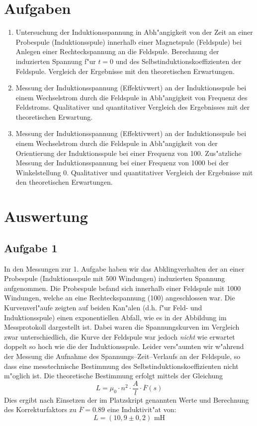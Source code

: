 \documentclass[a4paper,10pt]{article}
\begin{document}
\section{Aufgaben}
\begin{enumerate}
\item Untersuchung der Induktionsspannung in Abh"angigkeit von der Zeit an einer Probespule (Induktionsspule) innerhalb einer Magnetspule (Feldspule) bei Anlegen einer Rechteckspannung an die Feldspule. Berechnung der induzierten Spannung f"ur $t=0$ und des Selbstinduktionskoeffizienten der Feldspule. Vergleich der Ergebnisse mit den theoretischen Erwartungen.
\item Messung der Induktionsspannung (Effektivwert) an der Induktionsspule bei einem Wechselstrom durch die Feldspule in Abh"angigkeit von Frequenz des Feldstroms. Qualitativer und quantitativer Vergleich des Ergebnisses mit der theoretischen Erwartung.
\item Messung der Induktionsspannung (Effektivwert) an der Induktionsspule bei einem Wechselstrom durch die Feldspule in Abh"angigkeit von der Orientierung der Induktionsspule bei einer Frequenz von \unit{100}{\hertz}. Zus"atzliche Messung der Induktionsspannung bei einer Frequenz von \unit{1000}{\hertz} bei der Winkelstellung 0\degree. Qualitativer und quantitativer Vergleich der Ergebnisse mit den theoretischen Erwartungen. 
\end{enumerate}

\pagebreak
\newpage
\section{Auswertung}

\subsection{Aufgabe 1}
In den Messungen zur 1. Aufgabe haben wir das Abklingverhalten der an einer Probespule (Induktionsspule mit 500 Windungen) induzierten Spannung aufgenommen. Die Probespule befand sich innerhalb einer Feldspule mit 1000 Windungen, welche an eine Rechteckspannung (\unit{100}{\hertz}) angeschlossen war. Die Kurvenverl"aufe zeigten auf beiden Kan"alen (d.h. f"ur Feld- und Induktionsspule) einen exponentiellen Abfall, wie es in der Abbildung im Messprotokoll dargestellt ist. Dabei waren die Spannungskurven im Vergleich zwar unterschiedlich, die Kurve der Feldspule war jedoch \emph{nicht} wie erwartet doppelt so hoch wie die der Induktionsspule. Leider vers"aumten wir w"ahrend der Messung die Aufnahme des Spannungs--Zeit--Verlaufs an der Feldspule, so dass eine messtechnische Bestimmung des Selbstinduktionskoeffizienten nicht m"oglich ist. Die theoretische Bestimmung erfolgt mittels der Gleichung
\begin{equation}
L = \mu_0 \cdot n^2 \cdot \frac{A}{l} \cdot \overline{F}(s)
\end{equation}
Dies ergibt nach Einsetzen der im Platzskript genannten Werte und Berechnung des Korrekturfaktors zu $\overline{F}=0.89$ eine Induktivit"at von:
\begin{equation}
L = (10,9 \pm 0,2) \text{ mH}
\end{equation}
\end{document}
